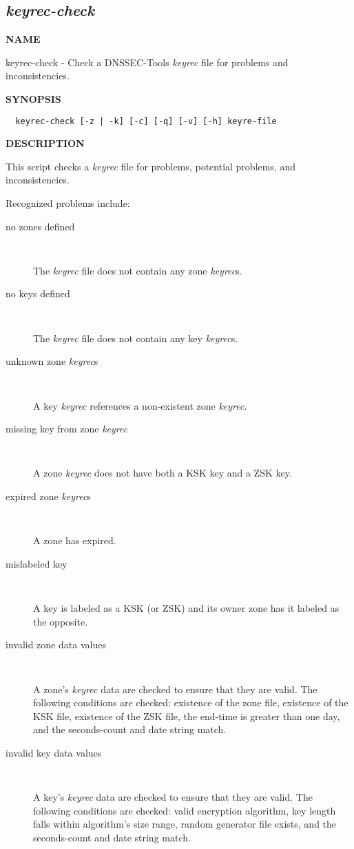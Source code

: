 \clearpage

\subsection{{\it keyrec-check}}


{\bf NAME}

keyrec-check - Check a DNSSEC-Tools {\it keyrec} file for problems and
inconsistencies.

{\bf SYNOPSIS}

\begin{verbatim}  keyrec-check [-z | -k] [-c] [-q] [-v] [-h] keyre-file\end{verbatim}

{\bf DESCRIPTION}

This script checks a {\it keyrec} file for problems, potential problems,
and inconsistencies.

Recognized problems include:

\begin{description}

\item [no zones defined]\verb" "

The {\it keyrec} file does not contain any zone {\it keyrec}s.

\item [no keys defined]\verb" "

The {\it keyrec} file does not contain any key {\it keyrec}s.

\item [unknown zone {\it keyrec}s]\verb" "

A key {\it keyrec} references a non-existent zone {\it keyrec}.

\item [missing key from zone {\it keyrec}]\verb" "

A zone {\it keyrec} does not have both a KSK key and a ZSK key.

\item [expired zone {\it keyrec}s]\verb" "

A zone has expired.

\item [mislabeled key]\verb" "

A key is labeled as a KSK (or ZSK) and its owner zone has it labeled as the
opposite.

\item [invalid zone data values]\verb" "

A zone's {\it keyrec} data are checked to ensure that they are valid.  The
following conditions are checked:  existence of the zone file, existence of
the KSK file, existence of the ZSK file, the end-time is greater than one
day, and the seconds-count and date string match.

\item [invalid key data values]\verb" "

A key's {\it keyrec} data are checked to ensure that they are valid.  The
following conditions are checked:  valid encryption algorithm, key length
falls within algorithm's size range, random generator file exists, and the
seconds-count and date string match.

\end{description}

